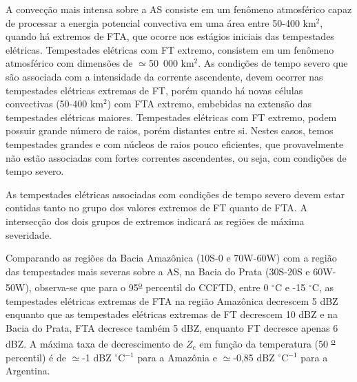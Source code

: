 
A convecção mais intensa sobre a AS consiste em um fenômeno atmosférico capaz de processar a energia potencial convectiva em uma área entre 50-400 km$^{2}$, quando há extremos de FTA, que ocorre nos estágios iniciais das tempestades elétricas. Tempestades elétricas com FT extremo, consistem em um fenômeno  atmosférico com dimensões de $\simeq$50~000 km$^{2}$. As condições de tempo severo que são associada com a intensidade da corrente ascendente, devem ocorrer nas tempestades elétricas extremas de FT, porém quando há novas células convectivas (50-400 km$^{2}$) com FTA extremo, embebidas na extensão das tempestades elétricas maiores. Tempestades elétricas com FT extremo, podem possuir grande número de raios, porém distantes entre si. Nestes casos, temos tempestades grandes e com núcleos de raios pouco eficientes, que provavelmente não estão associadas com fortes correntes ascendentes, ou seja, com condições de tempo severo.


As tempestades elétricas associadas com condições de tempo severo devem estar contidas tanto no grupo dos valores extremos de FT quanto de FTA. A intersecção dos dois grupos de extremos indicará as regiões de máxima severidade. %

Comparando as regiões da Bacia Amazônica (10S-0 e 70W-60W) com a região das tempestades mais severas sobre a AS, na Bacia do Prata (30S-20S e 60W-50W), observa-se que para o 95\textsuperscript{\underline{o}} percentil do CCFTD, entre 0 $^{\circ}$C e -15 $^{\circ}$C, as tempestades elétricas extremas de FTA na região Amazônica decrescem 5 dBZ enquanto que as tempestades elétricas extremas de FT decrescem 10 dBZ e na Bacia do Prata, FTA decresce também 5 dBZ, enquanto FT decresce apenas 6 dBZ. A máxima taxa de decrescimento de $Z_c$ em função da temperatura (50 \textsuperscript{\underline{o}} percentil) é de $\simeq$-1 dBZ $^{\circ}$C$^{-1}$ para a Amazônia e $\simeq$-0,85 dBZ $^{\circ}$C$^{-1}$ para a Argentina.


